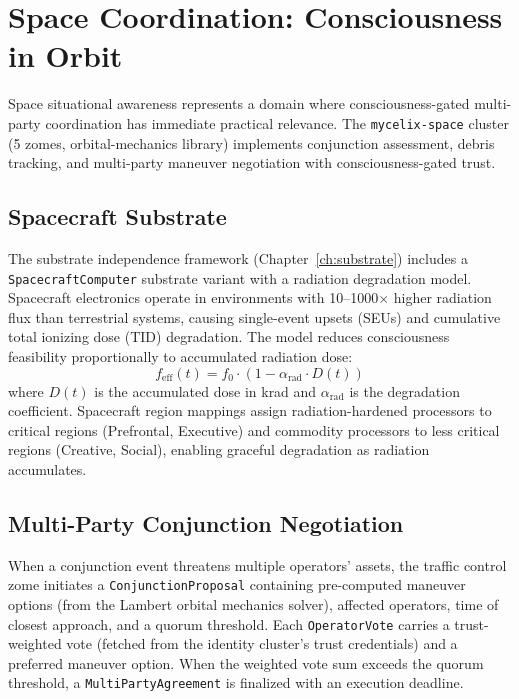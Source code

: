 \documentclass[12pt]{book}
\begin{document}
\chapter{Space Coordination: Consciousness in Orbit}
\label{ch:space}

Space situational awareness represents a domain where consciousness-gated multi-party coordination has immediate practical relevance. The \texttt{mycelix-space} cluster (5 zomes, orbital-mechanics library) implements conjunction assessment, debris tracking, and multi-party maneuver negotiation with consciousness-gated trust.

\section{Spacecraft Substrate}

The substrate independence framework (Chapter~\ref{ch:substrate}) includes a \texttt{SpacecraftComputer} substrate variant with a radiation degradation model. Spacecraft electronics operate in environments with 10--1000$\times$ higher radiation flux than terrestrial systems, causing single-event upsets (SEUs) and cumulative total ionizing dose (TID) degradation. The model reduces consciousness feasibility proportionally to accumulated radiation dose:
\begin{equation}
f_{\text{eff}}(t) = f_0 \cdot (1 - \alpha_{\text{rad}} \cdot D(t))
\end{equation}
where $D(t)$ is the accumulated dose in krad and $\alpha_{\text{rad}}$ is the degradation coefficient. Spacecraft region mappings assign radiation-hardened processors to critical regions (Prefrontal, Executive) and commodity processors to less critical regions (Creative, Social), enabling graceful degradation as radiation accumulates.

\section{Multi-Party Conjunction Negotiation}

When a conjunction event threatens multiple operators' assets, the traffic control zome initiates a \texttt{ConjunctionProposal} containing pre-computed maneuver options (from the Lambert orbital mechanics solver), affected operators, time of closest approach, and a quorum threshold. Each \texttt{OperatorVote} carries a trust-weighted vote (fetched from the identity cluster's trust credentials) and a preferred maneuver option. When the weighted vote sum exceeds the quorum threshold, a \texttt{MultiPartyAgreement} is finalized with an execution deadline.
\end{document}
